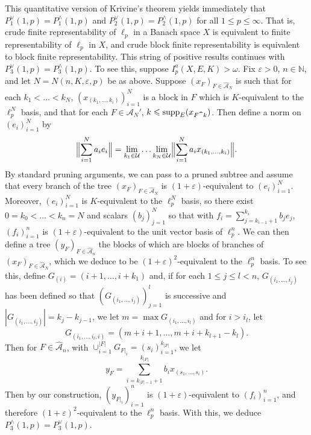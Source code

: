 \documentclass[12pt]{amsart}
\theoremstyle{definition}
\newcommand{\nn}{\mathbb{N}}
\newcommand{\aaa}{\mathcal{A}}
\newcommand{\uuu}{\mathcal{U}}
\newcommand{\supp}{\mathrm{supp}}
\begin{document}
This quantitative version of Krivine's theorem yields immediately that $P^\vee_1(1, p)=P^\wedge_1(1, p)$ and $P^\vee_2(1, p)=P^\wedge_2(1, p)$ for all $1\leqslant p\leqslant \infty$.  That is, crude finite representability of $\ell_p$ in a Banach space $X$ is equivalent to finite representability of $\ell_p$ in $X$, and crude block finite representability is equivalent to block finite representability.  This string of positive results continues with $P^\vee_3(1, p)=P^\wedge_3(1, p)$.  To see this, suppose $I_p^a(X, E, K)>\omega$.  Fix $\varepsilon>0$, $n\in \nn$, and let $N=N(n, K, \varepsilon,p)$ be as above.  Suppose $(x_F)_{F\in \widehat{\aaa}_N}$ is such that for each $k_1<\ldots <k_N$, $(x_{(k_1, \ldots, k_i)})_{i=1}^N$ is a block in $F$ which is $K$-equivalent to the $\ell_p^N$ basis, and that for each $F\in \aaa_N'$, $k\leqslant \supp_E(x_{F\verb!^!k})$.  Then define a norm on $(e_i)_{i=1}^N$ by $$\Bigl\|\sum_{i=1}^N a_i e_i\Bigr\| = \lim_{k_1\in \uuu}\ldots \lim_{k_N\in \uuu} \Bigl\|\sum_{i=1}^N a_i x_{(k_1, \ldots, k_i)}\Bigr\|.$$  By standard pruning arguments, we can pass to a pruned subtree and assume that every branch of the tree $(x_F)_{F\in \widehat{\aaa}_N}$ is $(1+\varepsilon)$-equivalent to $(e_i)_{i=1}^N$.  Moreover, $(e_i)_{i=1}^N$ is $K$-equivalent to the $\ell_p^N$ basis, so there exist $0=k_0<\ldots <k_n=N$ and scalars $(b_j)_{j=1}^N$ so that with $f_i=\sum_{j=k_{i-1}+1}^{k_i} b_je_j$, $(f_i)_{i=1}^n$ is $(1+\varepsilon)$-equivalent to the unit vector basis of $\ell_p^n$.  We can then define a tree $(y_F)_{F\in \widehat{\aaa}_n}$ the blocks of which are blocks of branches of $(x_F)_{F\in \widehat{\aaa}_N}$, which we deduce to be $(1+\varepsilon)^2$-equivalent to the $\ell_p^n$ basis. To see this, define $G_{(i)}=(i+1, \ldots, i+k_1)$ and, if for each $1\leqslant j\leqslant l<n$, $G_{(i_1, \ldots, i_j)}$ has been defined so that $(G_{(i_1, \ldots, i_j)})_{j=1}^l$ is successive and $|G_{(i_1, \ldots,i_j)}|=k_j-k_{j-1}$, we let $m=\max G_{(i_1, \ldots, i_l)}$ and for $i>i_l$, let $$G_{(i_1, \ldots, i_l, i)}= (m+i+1, \ldots, m+i+k_{l+1}-k_l).$$  Then for $F\in \widehat{\aaa}_n$, with $\cup_{i=1}^{|F|}G_{F|_i}=(s_i)_{i=1}^{k_{|F|}}$, we let $$y_F=\sum_{i=k_{|F|-1}+1}^{k_{|F|}} b_ix_{(s_1, \ldots, s_i)}. $$ Then by our construction, $(y_{F|_i})_{i=1}^n$ is $(1+\varepsilon)$-equivalent to $(f_i)_{i=1}^n$, and therefore $(1+\varepsilon)^2$-equivalent to the $\ell_p^n$ basis. With this, we deduce $P^\wedge_3(1, p)=P^\vee_3(1, p)$.  
\end{document}
